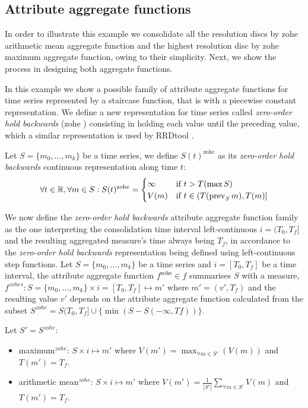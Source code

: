 \subsection{Attribute aggregate functions}

In order to illustrate this example we consolidate all the resolution
discs by zohe arithmetic mean aggregate function and the highest
resolution disc by zohe maximum aggregate function, owing to their
simplicity. Next, we show the process in designing both aggregate
functions.

In this example we show a possible family of attribute aggregate
functions for time series represented by a staircase function, that is
with a piecewise constant representation.  We define a new
representation for time series called \emph{zero-order hold backwards}
(zohe%
) consisting in holding each value until the preceding value, which a
similar representation is used by RRDtool \cite{lisa98:oetiker}.

Let $S=\{m_0,\ldots,m_k\}$ be a time series, we define
$S(t)^{\text{zohe}}$ as its \emph{zero-order hold backwards}
continuous representation along time $t$:
\[
\forall t \in \mathbb{R}  ,\forall m \in S:
S(t)^{\text{zohe}} =  
\begin{cases}
  \infty & \text{if } t > T(\max S) \\%
  V(m) & \text{if }  t\in (T(\prev_S m),T(m)]
\end{cases}
\]


We now define the \emph{zero-order hold backwards} attribute
aggregate function family as the one interpreting the
consolidation time interval left-continuous $i=(T_0,T_f]$ and the
resulting aggregated measure's time always being $T_f$, in
accordance to the \emph{zero-order hold backwards} representation
being defined using left-continuous step functions.  Let
$S=\{m_0,\ldots,m_k\}$ be a time series and $i=[T_0,T_f]$ be a time
interval, the attribute aggregate function $f^{\text{zohe}}\in f$
summarises $S$ with a measure, $f^{zohes}: S=\{m_0,\ldots,m_k\} \times
i=[T_0,T_f] \mapsto m'$ where $m'=(v',T_f)$ and the resulting value
$v'$ depends on the attribute aggregate function calculated from
the subset $S^{zohe}=S(T_0,T_f] \cup \{\min(S-S(-\infty,Tf))\}$.

Let $S'=S^{zohe}$:
\begin{itemize}
\item maximum$^{zohe}$: $S \times i \mapsto m'$ where $V(m') =
  \max_{\forall m \in S'}(V(m))$ and $T(m')=T_f$.
\item arithmetic mean$^{zohe}$: $S \times i \mapsto m'$ where $V(m')
  = \frac{1}{|S'|} \sum\limits_{\forall m\in S'} V(m)$ and
  $T(m')=T_f$. 
\end{itemize}







